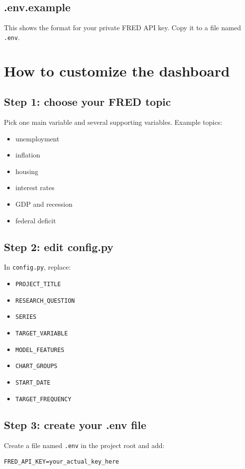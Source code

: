 \documentclass[11pt]{article}
\begin{document}
\subsection{.env.example}
This shows the format for your private FRED API key. Copy it to a file named \texttt{.env}.

\section{How to customize the dashboard}

\subsection{Step 1: choose your FRED topic}
Pick one main variable and several supporting variables. Example topics:
\begin{itemize}[leftmargin=1.5em]
  \item unemployment
  \item inflation
  \item housing
  \item interest rates
  \item GDP and recession
  \item federal deficit
\end{itemize}

\subsection{Step 2: edit config.py}
In \texttt{config.py}, replace:
\begin{itemize}[leftmargin=1.5em]
  \item \texttt{PROJECT\_TITLE}
  \item \texttt{RESEARCH\_QUESTION}
  \item \texttt{SERIES}
  \item \texttt{TARGET\_VARIABLE}
  \item \texttt{MODEL\_FEATURES}
  \item \texttt{CHART\_GROUPS}
  \item \texttt{START\_DATE}
  \item \texttt{TARGET\_FREQUENCY}
\end{itemize}

\subsection{Step 3: create your .env file}
Create a file named \texttt{.env} in the project root and add:
\begin{lstlisting}
FRED_API_KEY=your_actual_key_here
\end{lstlisting}
\end{document}
